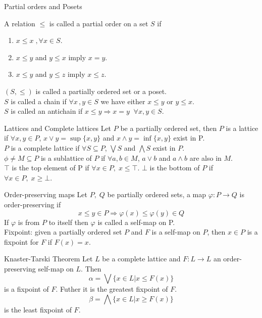 \documentclass[%
pdf,
colorBG,
slideColor,
azure
]{prosper}
\begin{document}
\begin{slide}{Partial orders and Posets}

A relation $\leq$ is called a partial order on a set $S$ if 
\begin{enumerate}
\item $x \leq x\;, \forall x \in S$.
\item $x \leq y$ and $y \leq x$ imply $x=y$.
\item $x \leq y$ and $y \leq z$ imply $x \leq z$.
\end{enumerate}
$(S,\leq)$ is called a partially ordered set or a poset.\\
\bigskip
$S$ is called a chain if $\forall x\,,y \in S$ we have either $x\leq y$ or $y\leq x$.\\
\bigskip
$S$ is called an antichain if $x\leq y \Rightarrow x=y\;\; \forall x,y \in S$.
\end{slide}

\begin{slide}{Lattices and Complete lattices}
Let $P$ be a partially ordered set, then $P$ is a lattice if $\forall x,y \in P$, $x \vee y = \sup\{x,y\}$ and $x \wedge y = \inf\{x,y\}$ exist in P.\\
\bigskip
$P$ is a complete lattice if $\forall S \subseteq P$, $\bigvee S$ and $\bigwedge S$ exist in $P$.\\
\bigskip
$\phi \neq M \subseteq P$ is a sublattice of $P$ if $\forall a,b \in M$, $a \vee b$ and $a \wedge b$ are also in $M$.\\
\bigskip
$\top$ is the top element of P if $\forall x \in P,\; x \leq \top$. $\bot$ is the bottom of $P$ if $\forall x \in P,\; x \geq \bot$.
\end{slide}

\begin{slide}{Order-preserving maps}
Let $P,\;Q$ be partially ordered sets, a map $\varphi : P \rightarrow Q$ is order-preserving if \\
\[x \leq y \in P \Rightarrow \varphi (x) \leq \varphi (y) \in Q\] If $\varphi$ is from $P$ to itself then $\varphi$ is called a self-map on P. \\
\bigskip
Fixpoint: given a partially ordered set $P$ and $F$ is a self-map on $P$, then $x \in P$ is a fixpoint for $F$ if $F(x)=x$.
\end{slide}

\begin{slide}{Knaster-Tarski Theorem}
Let $L$ be a complete lattice and $F:L\rightarrow L$ an order-preserving self-map on $L$. Then
\[ \alpha = \bigvee \{x \in L|x\leq F(x)\} \] is a fixpoint of $F$. Futher it is the greatest fixpoint of $F$.
\[ \beta = \bigwedge \{ x \in L | x \geq F(x)\} \] is the least fixpoint of $F$.
\end{slide}
\end{document}
